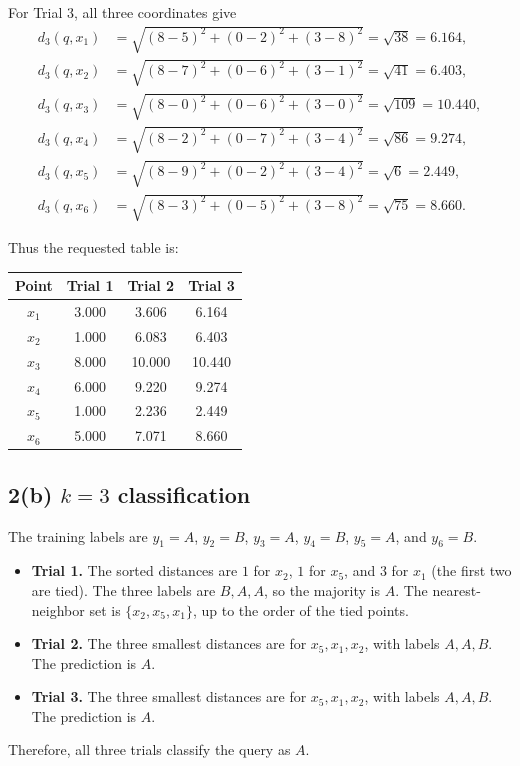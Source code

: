 \documentclass[11pt]{article}
\begin{document}
For Trial 3, all three coordinates give
\begin{align*}
 d_3(q,x_1)&=\sqrt{(8-5)^2+(0-2)^2+(3-8)^2}=\sqrt{38}=6.164,\\
 d_3(q,x_2)&=\sqrt{(8-7)^2+(0-6)^2+(3-1)^2}=\sqrt{41}=6.403,\\
 d_3(q,x_3)&=\sqrt{(8-0)^2+(0-6)^2+(3-0)^2}=\sqrt{109}=10.440,\\
 d_3(q,x_4)&=\sqrt{(8-2)^2+(0-7)^2+(3-4)^2}=\sqrt{86}=9.274,\\
 d_3(q,x_5)&=\sqrt{(8-9)^2+(0-2)^2+(3-4)^2}=\sqrt{6}=2.449,\\
 d_3(q,x_6)&=\sqrt{(8-3)^2+(0-5)^2+(3-8)^2}=\sqrt{75}=8.660.
\end{align*}

Thus the requested table is:
\begin{center}
\begin{tabular}{c|ccc}
\toprule
Point & Trial 1 & Trial 2 & Trial 3\\
\midrule
$x_1$ & 3.000 & 3.606 & 6.164\\
$x_2$ & 1.000 & 6.083 & 6.403\\
$x_3$ & 8.000 & 10.000 & 10.440\\
$x_4$ & 6.000 & 9.220 & 9.274\\
$x_5$ & 1.000 & 2.236 & 2.449\\
$x_6$ & 5.000 & 7.071 & 8.660\\
\bottomrule
\end{tabular}
\end{center}

\subsection*{2(b) $k=3$ classification}
The training labels are $y_1=A$, $y_2=B$, $y_3=A$, $y_4=B$,
$y_5=A$, and $y_6=B$.

\begin{itemize}
    \item \textbf{Trial 1.} The sorted distances are $1$ for $x_2$, $1$ for
    $x_5$, and $3$ for $x_1$ (the first two are tied).  The three labels are
    $B,A,A$, so the majority is $A$.  The nearest-neighbor set is
    \(\{x_2,x_5,x_1\}\), up to the order of the tied points.
    \item \textbf{Trial 2.} The three smallest distances are for
    $x_5,x_1,x_2$, with labels $A,A,B$.  The prediction is \(\boxed{A}\).
    \item \textbf{Trial 3.} The three smallest distances are for
    $x_5,x_1,x_2$, with labels $A,A,B$.  The prediction is \(\boxed{A}\).
\end{itemize}
Therefore, all three trials classify the query as $A$.
\end{document}
